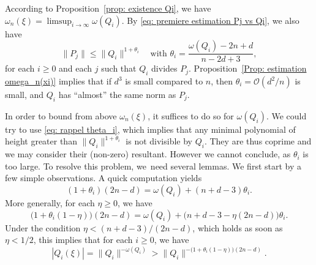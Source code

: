 \documentclass[JEP,XML,SOM,Unicode,NoFloatCountersInSection,published]{cedram}
\newcommand\GrO{\mathcal{O}}
\newcommand{\normH}[1]{\|#1\|}
\theoremstyle{definition}
\theoremstyle{plain}
\begin{document}
According to Proposition~\ref{prop: existence Qi}, we have $\omega_n(\xi) = \limsup_{i\to\infty}\omega(Q_i)$. By \eqref{eq: premiere estimation Pj vs Qi}, we also have
\begin{equation}
\label{eq: rappel theta_i}
\normH{P_j} \leq \normH{Q_i}^{1+\theta_i} \quad \textrm{with } \theta_i = \frac{\omega(Q_i)-2n+d}{n-2d+3},
\end{equation}
for each $i\geq 0$ and each $j$ such that $Q_i$ divides $P_j$. Proposition~\ref{Prop: estimation omega_n(xi)} implies that if $d^3$ is small compared to $n$, then $\theta_i = \GrO(d^2/n)$ is small, and $Q_i$ has ``almost'' the same norm as $P_j$.

In order to bound from above $\omega_n(\xi)$, it suffices to do so for $\omega(Q_i)$. We could try to use \eqref{eq: rappel theta_i}, which implies that any minimal polynomial of height greater than $\normH{Q_i}^{1+\theta_i}$ is not divisible by $Q_i$. They are thus coprime and we may consider their (non-zero) resultant. However we cannot conclude, as $\theta_i$ is too large. To resolve this problem, we~need several lemmas. We first start by a few simple observations. A quick computation yields
\begin{equation}
\label{equation fonctionnelle theta eq 1}
(1+\theta_i)(2n-d) = \omega(Q_i) + (n+d-3)\theta_i.
\end{equation}
More generally, for each $\eta\geq 0$, we have
\begin{equation}
\label{equation fonctionnelle theta eq 2}
\big(1+\theta_i(1-\eta) \big)(2n-d) = \omega(Q_i) + \big( n+d-3 - \eta(2n-d) \big)\theta_i.
\end{equation}
Under the condition $\eta < (n+d-3)/(2n-d)$, which holds as soon as $\eta < 1/2$, this implies that for each $i\geq 0$, we have
\begin{equation}
\label{equation: minoration de Q_i(xi) via theta_i}
|Q_i(\xi)| = \normH{Q_i}^{-\omega(Q_i)} > \normH{Q_i}^{-\big(1+\theta_i(1-\eta)\big)(2n-d)}.
\end{equation}
\end{document}
